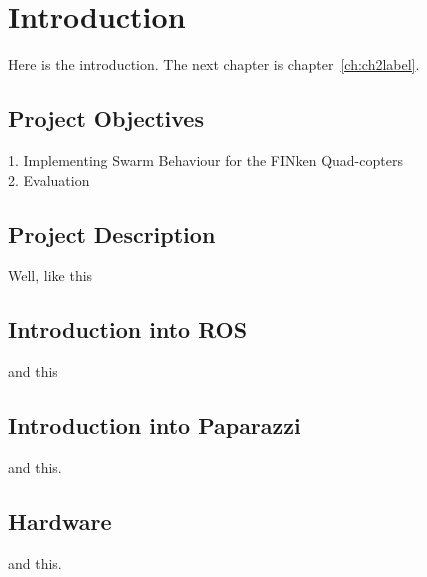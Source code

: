 \chapter{Introduction}\label{ch:introduction}
Here is the introduction. The next chapter is chapter~\ref{ch:ch2label}.

\section{Project Objectives}
1. Implementing Swarm Behaviour for the FINken Quad-copters \\
2. Evaluation

\section{Project Description}
Well, like this

\section{Introduction into ROS}
and this

\section{Introduction into Paparazzi}
and this.

\section{Hardware}
and this.
